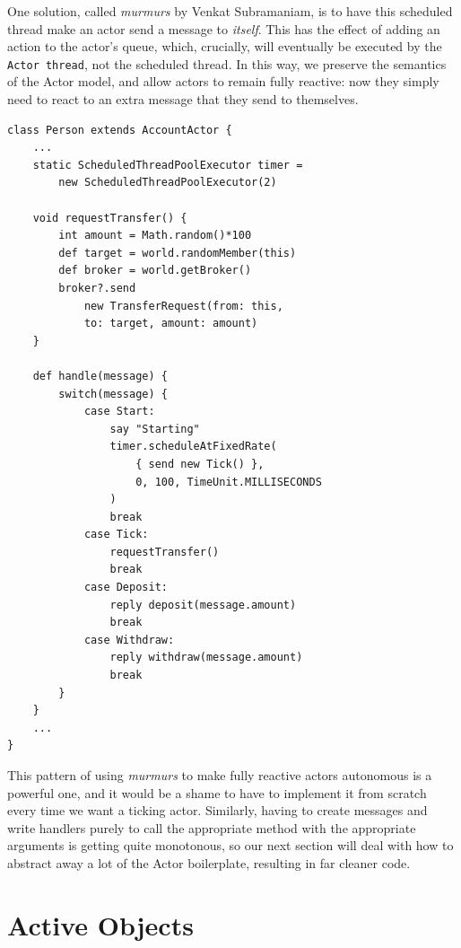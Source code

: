 \documentclass[a4paper,12pt]{kth-mag}
\begin{document}
One solution, called \textit{murmurs} by Venkat Subramaniam, is to have this scheduled thread make an actor send a message to \textit{itself}. This has the effect of adding an action to the actor's queue, which, crucially, will eventually be executed by the \texttt{Actor thread}, not the scheduled thread. In this way, we preserve the semantics of the Actor model, and allow actors to remain fully reactive: now they simply need to react to an extra message that they send to themselves.

\begin{listing}[H]
	\begin{verbatim}
class Person extends AccountActor {
    ...
    static ScheduledThreadPoolExecutor timer = 
        new ScheduledThreadPoolExecutor(2)

    void requestTransfer() {
        int amount = Math.random()*100
        def target = world.randomMember(this)
        def broker = world.getBroker()
        broker?.send 
            new TransferRequest(from: this, 
            to: target, amount: amount)
    }

    def handle(message) { 
        switch(message) {
            case Start:
                say "Starting"
                timer.scheduleAtFixedRate(
                    { send new Tick() },
                    0, 100, TimeUnit.MILLISECONDS
                )
                break
            case Tick:
                requestTransfer()
                break
            case Deposit:
                reply deposit(message.amount)
                break
            case Withdraw: 
                reply withdraw(message.amount)
                break
        }
    }
    ...
}
	\end{verbatim}
\end{listing}

This pattern of using \textit{murmurs} to make fully reactive actors autonomous is a powerful one, and it would be a shame to have to implement it from scratch every time we want a ticking actor. Similarly, having to create messages and write handlers purely to call the appropriate method with the appropriate arguments is getting quite monotonous, so our next section will deal with how to abstract away a lot of the Actor boilerplate, resulting in far cleaner code.

\section{Active Objects}
\end{document}
